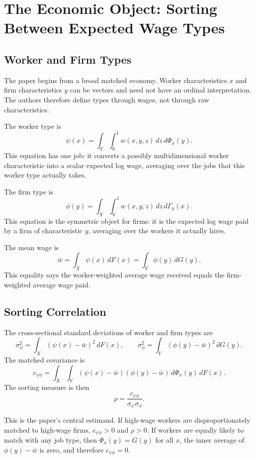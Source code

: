 \documentclass[11pt]{article}
\begin{document}
\section{The Economic Object: Sorting Between Expected Wage Types}

\subsection{Worker and Firm Types}

The paper begins from a broad matched economy. Worker characteristics $x$ and firm characteristics $y$ can be vectors and need not have an ordinal interpretation. The authors therefore define types through wages, not through raw characteristics.

The worker type is
\[
  \psi(x)
  =
  \int_Y\int_0^1 w(x,y,z)\,dz\,d\Phi_x(y).
\]
This equation has one job: it converts a possibly multidimensional worker characteristic into a scalar expected log wage, averaging over the jobs that this worker type actually takes.

The firm type is
\[
  \phi(y)
  =
  \int_X\int_0^1 w(x,y,z)\,dz\,d\Gamma_y(x).
\]
This equation is the symmetric object for firms: it is the expected log wage paid by a firm of characteristic $y$, averaging over the workers it actually hires.

The mean wage is
\[
  \bar w
  =
  \int_X \psi(x)\,dF(x)
  =
  \int_Y \phi(y)\,dG(y).
\]
This equality says the worker-weighted average wage received equals the firm-weighted average wage paid.

\subsection{Sorting Correlation}

The cross-sectional standard deviations of worker and firm types are
\[
  \sigma_\psi^2
  =
  \int_X(\psi(x)-\bar w)^2\,dF(x),
  \qquad
  \sigma_\phi^2
  =
  \int_Y(\phi(y)-\bar w)^2\,dG(y).
\]
The matched covariance is
\[
  c_{\psi\phi}
  =
  \int_X\int_Y
  (\psi(x)-\bar w)(\phi(y)-\bar w)
  \,d\Phi_x(y)\,dF(x).
\]
The sorting measure is then
\[
  \rho
  =
  \frac{c_{\psi\phi}}{\sigma_\psi\sigma_\phi}.
\]

This is the paper's central estimand. If high-wage workers are disproportionately matched to high-wage firms, $c_{\psi\phi}>0$ and $\rho>0$. If workers are equally likely to match with any job type, then $\Phi_x(y)=G(y)$ for all $x$, the inner average of $\phi(y)-\bar w$ is zero, and therefore $c_{\psi\phi}=0$.
\end{document}
